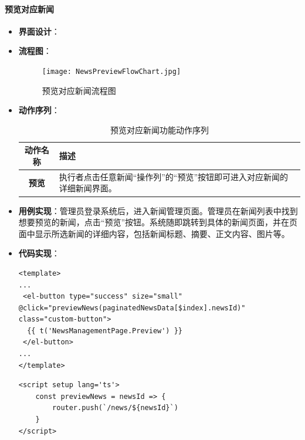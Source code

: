 \paragraph{预览对应新闻}
\begin{itemize}
	\item \textbf{界面设计}：
	\item \textbf{流程图}：
	\begin{figure}[H]
		\centering
		\texttt{[image: NewsPreviewFlowChart.jpg]}
		\caption{预览对应新闻流程图}
		\label{NewsPreviewFlowChart}
	\end{figure}
	\item \textbf{动作序列}：
	\begin{table}[H]
		\centering
		\caption{预览对应新闻功能动作序列}
		\renewcommand\arraystretch{1.5}
		\begin{tabular}{|c|>{\raggedright\arraybackslash}p{10cm}|}
			\hline
			\textbf{动作名称} & \textbf{描述} \\ \hline
			\textbf{预览} & 执行者点击任意新闻“操作列”的“预览”按钮即可进入对应新闻的详细新闻界面。 \\ \hline
		\end{tabular}
	\end{table}
	\item \textbf{用例实现}：管理员登录系统后，进入新闻管理页面。管理员在新闻列表中找到想要预览的新闻，点击“预览”按钮。系统随即跳转到具体的新闻页面，并在页面中显示所选新闻的详细内容，包括新闻标题、摘要、正文内容、图片等。
	\item \textbf{代码实现}：
	\begin{verbatim}
<template>
...
 <el-button type="success" size="small" @click="previewNews(paginatedNewsData[$index].newsId)" class="custom-button">
  {{ t('NewsManagementPage.Preview') }}
 </el-button>
...
</template>
	\end{verbatim}
	
	\begin{verbatim}
<script setup lang='ts'>
	const previewNews = newsId => {
		router.push(`/news/${newsId}`)
	}
</script>
	\end{verbatim}
\end{itemize}


